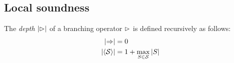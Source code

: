 \subsection{Local soundness}

\begin{definition}
  The \emph{depth} $\left|\mathbin{\rhd}\right|$ of a branching operator $\mathbin{\rhd}$ is defined
  recursively as follows:
  \begin{align*}
    \left|\Rightarrow\right| &= 0 \\
    \left|\mathbin{\langle \mathcal{S} \rangle}\right| &= 1 + \max_{S \in \mathcal{S}}{\left|S\right|}
  \end{align*}
\end{definition}



